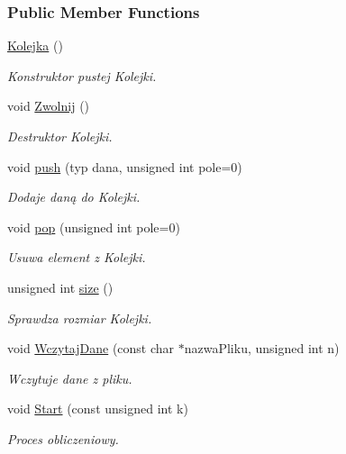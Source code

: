 \subsubsection*{Public Member Functions}
\begin{DoxyCompactItemize}
\item 
\hyperlink{class_kolejka_ae64d506b36a27fdf2c66e53aaa7ae79d}{Kolejka} ()
\begin{DoxyCompactList}\small\item\em Konstruktor pustej Kolejki. \end{DoxyCompactList}\item 
void \hyperlink{class_kolejka_a87be5cc66cf0f4c813b489c0a11c4b35}{Zwolnij} ()
\begin{DoxyCompactList}\small\item\em Destruktor Kolejki. \end{DoxyCompactList}\item 
void \hyperlink{class_kolejka_a9a58ac1ae2cd978f29cc31343e437343}{push} (typ dana, unsigned int pole=0)
\begin{DoxyCompactList}\small\item\em Dodaje daną do Kolejki. \end{DoxyCompactList}\item 
void \hyperlink{class_kolejka_a9c41aaf09b6a9a336e33cb49486a2bf8}{pop} (unsigned int pole=0)
\begin{DoxyCompactList}\small\item\em Usuwa element z Kolejki. \end{DoxyCompactList}\item 
unsigned int \hyperlink{class_kolejka_aed97a8e2e6d7092a36cdc55c89df64f2}{size} ()
\begin{DoxyCompactList}\small\item\em Sprawdza rozmiar Kolejki. \end{DoxyCompactList}\item 
void \hyperlink{class_kolejka_aed2f002e78d62b2680023114c4cef18f}{Wczytaj\-Dane} (const char $\ast$nazwa\-Pliku, unsigned int n)
\begin{DoxyCompactList}\small\item\em Wczytuje dane z pliku. \end{DoxyCompactList}\item 
void \hyperlink{class_kolejka_a5a8c5757bdb72a76b004891d393adc94}{Start} (const unsigned int k)
\begin{DoxyCompactList}\small\item\em Proces obliczeniowy. \end{DoxyCompactList}\end{DoxyCompactItemize}

